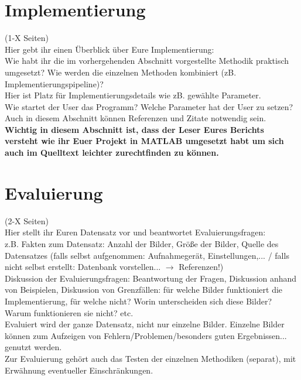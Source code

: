 \documentclass[paper=A4, deutsch]{scrartcl}
\begin{document}
\section{Implementierung}
(1-X Seiten)\\
Hier gebt ihr einen Überblick über Eure Implementierung:\\
Wie habt ihr die im vorhergehenden Abschnitt vorgestellte Methodik praktisch umgesetzt? Wie werden die einzelnen Methoden kombiniert (zB. Implementierungspipeline)?\\
Hier ist Platz für Implementierungsdetails wie zB. gewählte Parameter. \\
Wie startet der User das Programm? Welche Parameter hat der User zu setzen?\\
Auch in diesem Abschnitt können Referenzen und Zitate notwendig sein.\\
\textbf{Wichtig in diesem Abschnitt ist, dass der Leser Eures Berichts versteht wie ihr Euer Projekt in MATLAB umgesetzt habt um sich auch im Quelltext leichter zurechtfinden zu können.}

\section{Evaluierung}
(2-X Seiten)\\
Hier stellt ihr Euren Datensatz vor und beantwortet Evaluierungsfragen:\\
z.B. Fakten zum Datensatz: Anzahl der Bilder, Größe der Bilder, Quelle des Datensatzes (falls selbst aufgenommen: Aufnahmegerät, Einstellungen,... / falls nicht selbst erstellt: Datenbank vorstellen... $\to$ Referenzen!)\\
Diskussion der Evaluierungsfragen: Beantwortung der Fragen, Diskussion anhand von Beispielen, Diskussion von Grenzfällen: für welche Bilder funktioniert die Implementierung, für welche nicht? Worin unterscheiden sich diese Bilder? Warum funktionieren sie nicht? etc.\\
Evaluiert wird der ganze Datensatz, nicht nur einzelne Bilder. Einzelne Bilder können zum Aufzeigen von Fehlern/Problemen/besonders guten Ergebnissen... genutzt werden.\\
Zur Evaluierung gehört auch das Testen der einzelnen Methodiken (separat), mit Erwähnung eventueller Einschränkungen.
\end{document}
